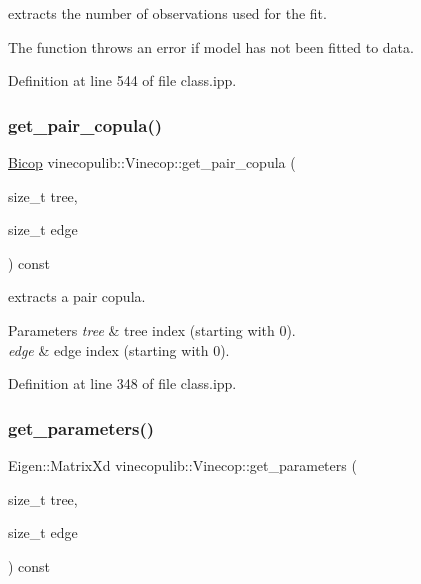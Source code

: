extracts the number of observations used for the fit. 

The function throws an error if model has not been fitted to data. 

Definition at line 544 of file class.\+ipp.

\mbox{\label{classvinecopulib_1_1_vinecop_a5a75b825ad6091d734dc163c3277b36b}} 
\subsubsection{\texorpdfstring{get\+\_\+pair\+\_\+copula()}{get\_pair\_copula()}}
{\footnotesize\ttfamily \hyperlink{classvinecopulib_1_1_bicop}{Bicop} vinecopulib\+::\+Vinecop\+::get\+\_\+pair\+\_\+copula (\begin{DoxyParamCaption}\item[{size\+\_\+t}]{tree,  }\item[{size\+\_\+t}]{edge }\end{DoxyParamCaption}) const\hspace{0.3cm}{\ttfamily [inline]}}



extracts a pair copula. 


\begin{DoxyParams}{Parameters}
{\em tree} & tree index (starting with 0). \\
\hline
{\em edge} & edge index (starting with 0). \\
\hline
\end{DoxyParams}


Definition at line 348 of file class.\+ipp.

\mbox{\label{classvinecopulib_1_1_vinecop_a16872eaecac2cf3f90c7f282c453fe58}} 
\subsubsection{\texorpdfstring{get\+\_\+parameters()}{get\_parameters()}}
{\footnotesize\ttfamily Eigen\+::\+Matrix\+Xd vinecopulib\+::\+Vinecop\+::get\+\_\+parameters (\begin{DoxyParamCaption}\item[{size\+\_\+t}]{tree,  }\item[{size\+\_\+t}]{edge }\end{DoxyParamCaption}) const\hspace{0.3cm}{\ttfamily [inline]}}



